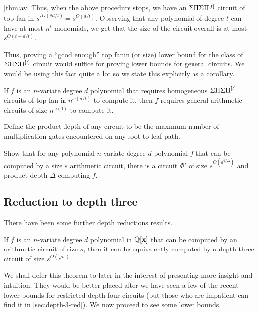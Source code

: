 \begin{proofof}{\autoref{thm:av}}
Thus, when the above procedure stops, we have an $\Sigma\Pi\Sigma\Pi^{[t]}$ circuit of top fan-in $s'^{O(8d/t)} = s^{O(d/t)}$. 
Observing that any polynomial of degree $t$ can have at most $n^t$ monomials, we get that the size of the circuit overall is at most $s^{O(t + d/t)}$. 
\end{proofof}

Thus, proving a ``good enough'' top fanin (or size) lower bound for the class of $\Sigma\Pi\Sigma\Pi^{[t]}$ circuit would suffice for proving lower bounds for general circuits. 
We would be using this fact quite a lot so we state this explicitly as a corollary. 

\begin{corollary}\label{cor:av}
If $f$ is an $n$-variate degree $d$ polynomial that requires homogeneous $\Sigma\Pi\Sigma\Pi^{[t]}$ circuits of top fan-in $n^{\omega(d/t)}$ to compute it, then $f$ requires general arithmetic circuits of size $n^{\omega(1)}$ to compute it. 
\end{corollary}

\begin{exercise}
Define the product-depth of any circuit to be the maximum number of multiplication gates encountered on any root-to-leaf path. 

Show that for any polynomial $n$-variate degree $d$ polynomial $f$ that can be computed by a size $s$ arithmetic circuit, there is a circuit $\Phi'$ of size $s^{O(d^{1/\Delta})}$ and product depth $\Delta$ computing $f$. 
\end{exercise}

\subsection*{Reduction to depth three}

There have been some further depth reductions results. 

\begin{theorem} If $f$ is an $n$-variate degree $d$ polynomial in $\mathbb{Q}[\mathbf{x}]$ that can be computed by an arithmetic circuit of size $s$, then it can be equivalently computed by a depth three circuit of size $s^{O(\sqrt{d})}$. 
\end{theorem}

We shall defer this theorem to later in the interest of presenting more insight and intuition. 
They would be better placed after we have seen a few of the recent lower bounds for restricted depth four circuits (but those who are impatient can find it in \autoref{sec:depth-3-red}). 
We now proceed to see some lower bounds. 


